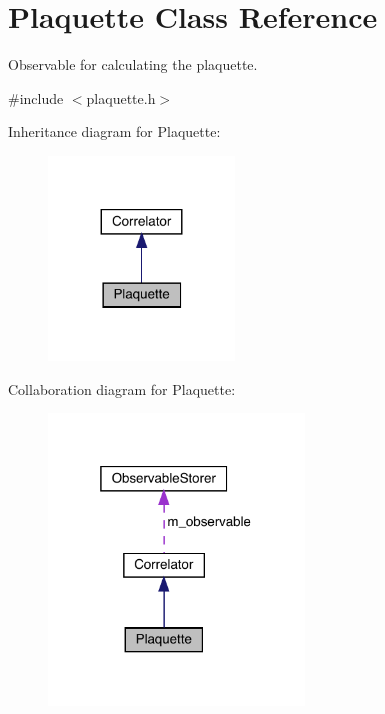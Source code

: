 \hypertarget{class_plaquette}{}\section{Plaquette Class Reference}
\label{class_plaquette}


Observable for calculating the plaquette.  




{\ttfamily \#include $<$plaquette.\+h$>$}



Inheritance diagram for Plaquette\+:
\nopagebreak
\begin{figure}[H]
\begin{center}
\leavevmode
\includegraphics[width=140pt]{class_plaquette__inherit__graph}
\end{center}
\end{figure}


Collaboration diagram for Plaquette\+:
\nopagebreak
\begin{figure}[H]
\begin{center}
\leavevmode
\includegraphics[width=193pt]{class_plaquette__coll__graph}
\end{center}
\end{figure}
